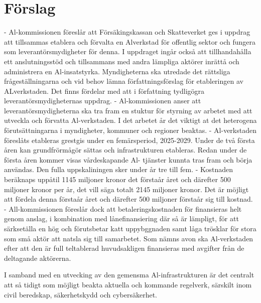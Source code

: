 {{{{{{{{{{{{{{{\section*{Förslag}
- Al-kommissionen föreslår att Försäkingskassan och Skatteverket ges i uppdrag att tillsammas etablera och förvalta en Alverkstad för offentlig sektor och fungera som leverantörsmydigheter för denna. I uppdraget ingår också att tillhandahålla ett anslutningsstöd och tillsammans med andra lämpliga aktörer inrättå och administrera en Al-insatstyrka. Myndigheterna ska utredade det rättsliga frågeställningarna och vid behov lämna författningsförslag för etableringen av ALverkstaden. Det finns fördelar med att i författning tydligögra leverantörsmydigheternas uppdrag.
- Al-kommissionen anser att leverantörsmydigheterna ska tra fram en stuktur för styrning av arbetet med att utveckla och förvatta Al-verkstaden. I det arbetet år det viktigt at det heterogena förutsättningarna i myndigheter, kommuner och regioner beaktas.
- Al-verkstaden föreslåts etableras grestgis under en femärsperiod, 2025-2029. Under de två första åren kan grundfrörmågör sättas och infrastrukturen etableras. Redan under de första åren kommer visas vårdeskapande Al- tjänster kunnta tras fram och börja användas. Den fulla uppskaliningen sker under år tre till fem.
- Kostnaden beräknaps uppåtil 1145 miljoner kronor det förstaår året och därefter 500 miljoner kronor per år, det vill säga totalt 2145 miljoner kronor. Det är möjligt att fördela denna förstaår året och därefter 500 miljoner förstaår sig till kostnad.
- All-kommissionen föreslår dock att betaleringskostnaden för finansieras helt genom anslag, i kombination med lånefinansiering där så är lämpligt, för att särksetälla en hög och förutsbetar katt uppybggnaden samt låga trösklar för stora som små aktör att natsla sig till samarbetet. Som nämns avon ska Al-verkstaden efter att den är full teltablerad huvudsakligen finansieras med avgifter från de deltagande aktörerna.

I samband med en utvecking av den gemensma Al-infrastrukturen är det centralt att så tidigt som möjligt beakta aktuella och kommande regelverk, särskilt inom civil beredskap, säkerhetskydd och cybersäkerhet.
}}}}}}}}}}}}}}}
